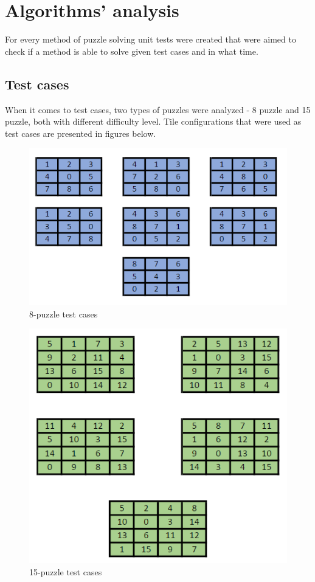 \documentclass[12pt]{article}
\begin{document}
\section{Algorithms' analysis}

For every method of puzzle solving unit tests were created that were aimed to check if a method is able to solve given test cases and in what time.

\subsection {Test cases}

When it comes to test cases, two types of puzzles were analyzed - 8 puzzle and 15 puzzle, both with different difficulty level. Tile configurations that were used as test cases are presented in figures below.

\begin{figure}[h]
    \includegraphics[scale=0.75]{eight_puzzle_test}
    \centering
    \caption{8-puzzle test cases}
\end{figure}

\begin{figure}[h]
    \includegraphics[scale=0.75]{fifteen_puzzle_test}
    \centering
    \caption{15-puzzle test cases}
\end{figure}
\end{document}
